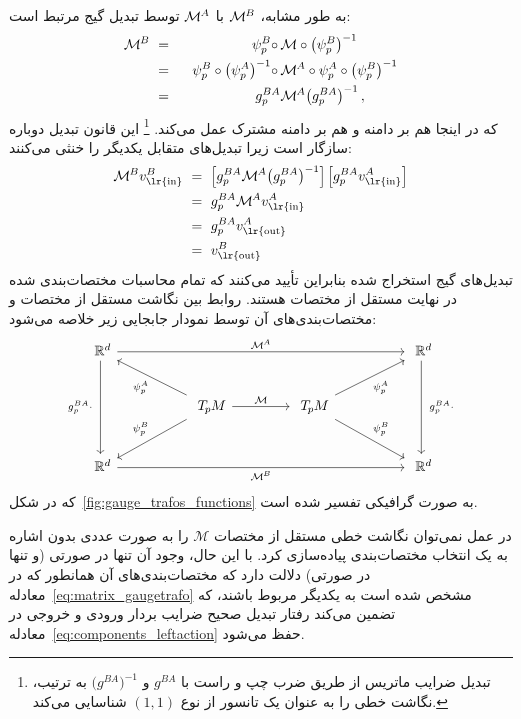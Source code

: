 به طور مشابه، $\mathcal{M}^{\mkern-1mu B}$ با $\mathcal{M}^{\mkern-1mu A}$ توسط تبدیل گیج مرتبط است:
\begin{alignat}{2}\label{eq:matrix_gaugetrafo}
	\mathcal{M}^{\mkern-1mu B}
	\ &=&\ \ \psi_p^B \circ\, &\mathcal{M} \circ \big(\psi_p^B\big)^{-1} \notag \\
	\ &=&\ \ \psi_p^B \circ \big(\psi_p^A\big)^{-1} \circ\, &\mathcal{M}^{\mkern-1mu A} \circ \psi_p^A \circ \big(\psi_p^B\big)^{-1} \notag \\
	\ &=&\ \ g_p^{BA} &\mathcal{M}^{\mkern-1mu A} \big(g_p^{BA}\big)^{-1} \,,
\end{alignat}
که در اینجا هم بر دامنه و هم بر دامنه مشترک عمل می‌کند.%
\footnote{
	تبدیل ضرایب ماتریس از طریق ضرب چپ و راست با $g^{BA}$ و $\big(g^{BA}\big)^{-1}$ به ترتیب، نگاشت خطی را به عنوان یک تانسور از نوع $(1,1)$ شناسایی می‌کند.
}
این قانون تبدیل دوباره سازگار است زیرا تبدیل‌های متقابل یکدیگر را خنثی می‌کنند:
\begin{align}
	\MBB v^B_\text{\lr{in}}
	\ &=\ \pig[ g_p^{BA} \MAA \big(g_p^{BA}\big)^{-1} \pig]\, \pig[ g_p^{BA} v_\text{\lr{in}}^A \pig] \notag \\
	\ &=\ g_p^{BA} \MAA v_\text{\lr{in}}^A \notag \\
	\ &=\ g_p^{BA} v_\text{\lr{out}}^A \notag \\
	\ &=\ v_\text{\lr{out}}^B
\end{align}
تبدیل‌های گیج استخراج شده بنابراین تأیید می‌کنند که تمام محاسبات مختصات‌بندی شده در نهایت مستقل از مختصات هستند.
روابط بین نگاشت مستقل از مختصات و مختصات‌بندی‌های آن توسط نمودار جابجایی زیر خلاصه می‌شود:
\begin{equation}\label{eq:linear_map_TpM_diagram}
	\begin{tikzcd}[column sep=50pt, row sep=25pt, font=\normalsize]
		\R^d
		\arrow[dd, "g_p^{BA}\cdot\ "']
		\arrow[rrr, "\MAA"]
		& &[-2ex] &
		\R^d
		\arrow[dd, "\ g_p^{BA}\cdot"]
		\\
		&
		\TpM
		\arrow[ul, "\psi_p^A"]
		\arrow[dl, "\psi_p^B"']
		\arrow[r, "\mathcal{M}"]
		&
		\TpM
		\arrow[ur, "\psi_p^A"']
		\arrow[dr, "\psi_p^B"]
		\\
		\R^d
		\arrow[rrr, "\MBB"']
		& & &
		\R^d
	\end{tikzcd}
\end{equation}
که در شکل~\ref{fig:gauge_trafos_functions} به صورت گرافیکی تفسیر شده است.

در عمل نمی‌توان نگاشت خطی مستقل از مختصات $\mathcal{M}$ را به صورت عددی بدون اشاره به یک انتخاب مختصات‌بندی پیاده‌سازی کرد.
با این حال، وجود آن تنها در صورتی (و تنها در صورتی) دلالت دارد که مختصات‌بندی‌های آن همانطور که در معادله~\eqref{eq:matrix_gaugetrafo} مشخص شده است به یکدیگر مربوط باشند، که تضمین می‌کند رفتار تبدیل صحیح ضرایب بردار ورودی و خروجی در معادله~\eqref{eq:components_leftaction} حفظ می‌شود.


